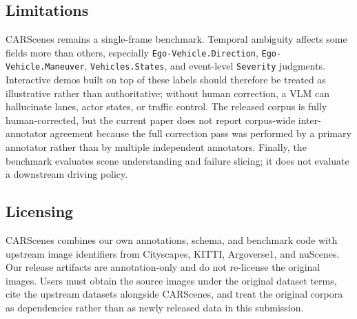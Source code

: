 \subsection{Limitations}
CARScenes remains a single-frame benchmark. Temporal ambiguity affects some fields more than others, especially \texttt{Ego-Vehicle.Direction}, \texttt{Ego-Vehicle.Maneuver}, \texttt{Vehicles.States}, and event-level \texttt{Severity} judgments. Interactive demos built on top of these labels should therefore be treated as illustrative rather than authoritative; without human correction, a VLM can hallucinate lanes, actor states, or traffic control. The released corpus is fully human-corrected, but the current paper does not report corpus-wide inter-annotator agreement because the full correction pass was performed by a primary annotator rather than by multiple independent annotators. Finally, the benchmark evaluates scene understanding and failure slicing; it does not evaluate a downstream driving policy.

\subsection{Licensing}
CARScenes combines our own annotations, schema, and benchmark code with upstream image identifiers from Cityscapes, KITTI, Argoverse1, and nuScenes. Our release artifacts are annotation-only and do not re-license the original images. Users must obtain the source images under the original dataset terms, cite the upstream datasets alongside CARScenes, and treat the original corpora as dependencies rather than as newly released data in this submission.
